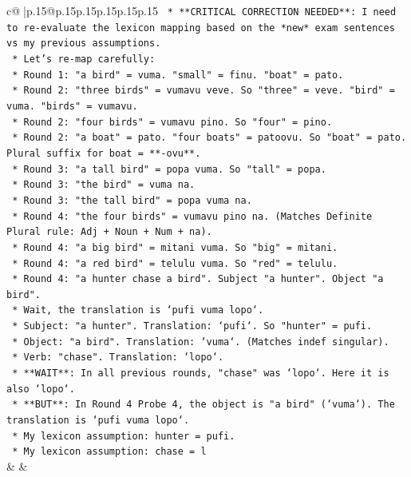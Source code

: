 \documentclass{article}
\begin{document}
{\begin{supertabular}{c@{$\;$}|p{.15\linewidth}@{}p{.15\linewidth}p{.15\linewidth}p{.15\linewidth}p{.15\linewidth}p{.15\linewidth}}
{{{\texttt{        *   **CRITICAL CORRECTION NEEDED**: I need to re{-}evaluate the lexicon mapping based on the *new* exam sentences vs my previous assumptions.} \\
\texttt{        *   Let's re{-}map carefully:} \\
\texttt{            *   Round 1: "a bird" = vuma. "small" = finu. "boat" = pato.} \\
\texttt{            *   Round 2: "three birds" = vumavu veve. So "three" = veve. "bird" = vuma. "birds" = vumavu.} \\
\texttt{            *   Round 2: "four birds" = vumavu pino. So "four" = pino.} \\
\texttt{            *   Round 2: "a boat" = pato. "four boats" = patoovu. So "boat" = pato. Plural suffix for boat = **{-}ovu**.} \\
\texttt{            *   Round 3: "a tall bird" = popa vuma. So "tall" = popa.} \\
\texttt{            *   Round 3: "the bird" = vuma na.} \\
\texttt{            *   Round 3: "the tall bird" = popa vuma na.} \\
\texttt{            *   Round 4: "the four birds" = vumavu pino na. (Matches Definite Plural rule: Adj + Noun + Num + na).} \\
\texttt{            *   Round 4: "a big bird" = mitani vuma. So "big" = mitani.} \\
\texttt{            *   Round 4: "a red bird" = telulu vuma. So "red" = telulu.} \\
\texttt{            *   Round 4: "a hunter chase a bird". Subject "a hunter". Object "a bird".} \\
\texttt{                *   Wait, the translation is `pufi vuma lopo`.} \\
\texttt{                *   Subject: "a hunter". Translation: `pufi`. So "hunter" = pufi.} \\
\texttt{                *   Object: "a bird". Translation: `vuma`. (Matches indef singular).} \\
\texttt{                *   Verb: "chase". Translation: `lopo`.} \\
\texttt{                *   **WAIT**: In all previous rounds, "chase" was `lopo`. Here it is also `lopo`.} \\
\texttt{                *   **BUT**: In Round 4 Probe 4, the object is "a bird" (`vuma`). The translation is `pufi vuma lopo`.} \\
\texttt{                *   My lexicon assumption: hunter = pufi.} \\
\texttt{                *   My lexicon assumption: chase = l} \\
            }
        }
    }
    & & \\ \\


\end{supertabular}}
\end{document}

